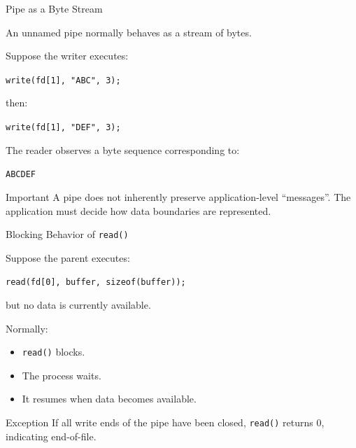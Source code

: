 \documentclass[aspectratio=169]{beamer}
\begin{document}
\begin{frame}{Pipe as a Byte Stream}

An unnamed pipe normally behaves as a stream of bytes.

Suppose the writer executes:

\begin{center}
\texttt{write(fd[1], "ABC", 3);}
\end{center}

then:

\begin{center}
\texttt{write(fd[1], "DEF", 3);}
\end{center}

The reader observes a byte sequence corresponding to:

\begin{center}
\Large
\texttt{ABCDEF}
\end{center}

\begin{alertblock}{Important}
A pipe does not inherently preserve application-level ``messages''.
The application must decide how data boundaries are represented.
\end{alertblock}

\end{frame}

\begin{frame}{Blocking Behavior of \texttt{read()}}

Suppose the parent executes:

\begin{center}
\texttt{read(fd[0], buffer, sizeof(buffer));}
\end{center}

but no data is currently available.

Normally:

\begin{itemize}
    \item \texttt{read()} blocks.
    \item The process waits.
    \item It resumes when data becomes available.
\end{itemize}

\begin{alertblock}{Exception}
If all write ends of the pipe have been closed, \texttt{read()} returns 0,
indicating end-of-file.
\end{alertblock}

\end{frame}
\end{document}
